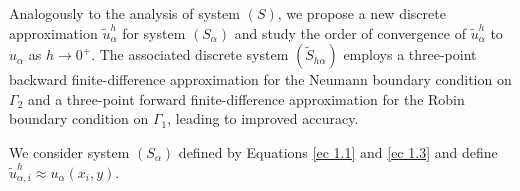 \documentclass[11pt]{article}
\begin{document}
\begin{flushleft}


Analogously to the analysis of system $(S)$, we propose a new discrete approximation ${\widetilde{u}^h_\alpha}$ for system $(S_\alpha)$ and study the order of convergence of ${\widetilde{u}^h_\alpha}$ to $u_\alpha$ as $h \to 0^+$. The associated discrete system $(\widetilde{S}_{h\alpha})$ employs a three-point backward finite-difference approximation for the Neumann boundary condition on $\Gamma_2$ and a three-point forward finite-difference approximation for the Robin boundary condition on $\Gamma_1$, leading to improved accuracy.


We consider system $(S_\alpha)$ defined by Equations \eqref{ec 1.1} and \eqref{ec 1.3} and define ${\widetilde{u}^h_{\alpha,i}} \approx u_\alpha(x_i, y)$. 


\end{flushleft}
\end{document}

